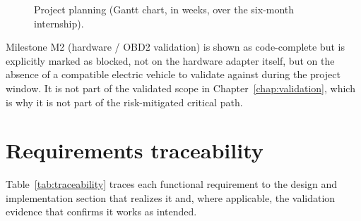 \begin{figure}[H]
\centering
{}
\caption{Project planning (Gantt chart, in weeks, over the six-month internship).}
\label{fig:gantt}
\end{figure}

Milestone M2 (hardware / OBD2 validation) is shown as code-complete but is explicitly marked as blocked, not on the hardware adapter itself, but on the absence of a compatible electric vehicle to validate against during the project window. It is not part of the validated scope in Chapter~\ref{chap:validation}, which is why it is not part of the risk-mitigated critical path.

\section{Requirements traceability}

Table~\ref{tab:traceability} traces each functional requirement to the design and implementation section that realizes it and, where applicable, the validation evidence that confirms it works as intended.

